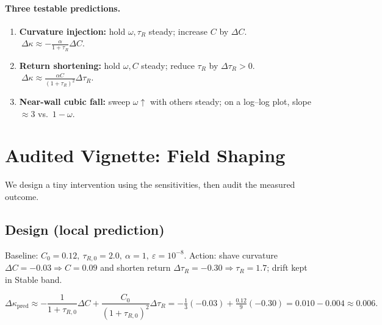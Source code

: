 \paragraph{Three testable predictions.}
\begin{enumerate}[leftmargin=1.25em]
  \item \textbf{Curvature injection:} hold \(\omega,\tau_R\) steady; increase \(C\) by \(\Delta C\).
  \(\ \Delta\kappa \approx -\frac{\alpha}{1+\tau_R}\Delta C\).
  \item \textbf{Return shortening:} hold \(\omega,C\) steady; reduce \(\tau_R\) by \(\Delta\tau_R>0\).
  \(\ \Delta\kappa \approx \frac{\alpha C}{(1+\tau_R)^2}\Delta\tau_R\).
  \item \textbf{Near-wall cubic fall:} sweep \(\omega\uparrow\) with others steady; on a log–log plot, slope \(\approx 3\) vs.\ \(1-\omega\).
\end{enumerate}

\section{Audited Vignette: Field Shaping}
We design a tiny intervention using the sensitivities, then audit the measured outcome.

\subsection*{Design (local prediction)}
Baseline: \(C_0=0.12,\ \tau_{R,0}=2.0,\ \alpha=1,\ \varepsilon=10^{-8}\).
Action: shave curvature \(\Delta C=-0.03\Rightarrow C=0.09\) and shorten return \(\Delta\tau_R=-0.30\Rightarrow \tau_R=1.7\); drift kept in Stable band.

\[
\Delta\kappa_{\text{pred}}
\approx -\frac{1}{1+\tau_{R,0}}\Delta C
       + \frac{C_0}{(1+\tau_{R,0})^2}\Delta\tau_R
= -\tfrac{1}{3}(-0.03) + \tfrac{0.12}{9}(-0.30)
= 0.010 - 0.004 \approx 0.006.
\]

